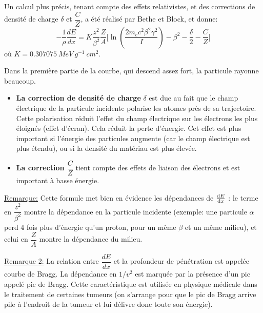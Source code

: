     
Un calcul plus précis, tenant compte des effets relativistes, et des corrections de densité de charge $\delta$ et $\dfrac{C}{Z}$, a été réalisé par Bethe et Block, et donne: 
    \[
    -\dfrac{1}{\rho}\dfrac{dE}{dx}=K\dfrac{z^2}{\beta^2}\dfrac{Z}{A}\lbrack\ln{(\dfrac{2m_ec^2\beta^2\gamma^2}{I})-\beta^2-\dfrac{\delta}{2}-\dfrac{C}{Z}\rbrack}
    \]
où $K=0.307075~MeV~g^{-1}~cm^2$. \\

\vspace{0.2cm}

Dans la première partie de la courbe, qui descend assez fort, la particule rayonne beaucoup. 

\begin{itemize}[label=$\rightarrow$]
    \item \textbf{La correction de densité de charge} $\delta$ est due au fait que le champ électrique de la particule incidente polarise les atomes près de sa trajectoire. Cette polarisation réduit l'effet du champ électrique sur les électrons les plus éloignés (effet d'écran). Cela réduit la perte d'énergie. Cet effet est plus important si l'énergie des particules augmente (car le champ électrique est plus étendu), ou si la densité du matériau est plus élevée.
    \item \textbf{La correction $\dfrac{C}{Z}$} tient compte des effets de liaison des électrons et est important à basse énergie. 
\end{itemize} 
    
    \underline{Remarque:} Cette formule met bien en évidence les dépendances de $\dv{E}{x}$ : le terme en $\dfrac{z^2}{\beta^2}$ montre la dépendance en la particule incidente (exemple: une particule $\alpha$ perd 4 fois plus d'énergie qu'un proton, pour un même $\beta$ et un même milieu), et celui en $\dfrac{Z}{A}$ montre la dépendance du milieu. 
    
    \underline{Remarque 2:} La relation entre $\dfrac{dE}{dx}$ et la profondeur de pénétration est appelée courbe de Bragg. La dépendance en $1/v^2$ est marquée par la présence d'un pic appelé pic de Bragg. Cette caractéristique est utilisée en physique médicale dans le traitement de certaines tumeurs (on s'arrange pour que le pic de Bragg arrive pile à l'endroit de la tumeur et lui délivre donc toute son énergie). 
    
